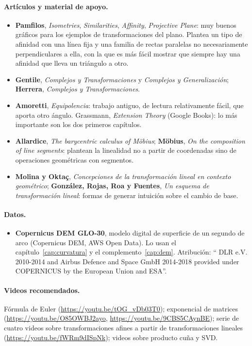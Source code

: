 \paragraph{Artículos y material de apoyo.}
\begin{itemize}
  \item \textbf{Pamfilos}, \emph{Isometries}, \emph{Similarities}, \emph{Affinity},
  \emph{Projective Plane}: muy buenos gráficos para los ejemplos de transformaciones del plano.
  Plantea un tipo de afinidad con una línea fija y una familia de rectas paralelas no
  necesariamente perpendiculares a ella, con la que es más fácil mostrar que siempre hay una
  afinidad que lleva un triángulo a otro.
  \item \textbf{Gentile}, \emph{Complejos y Transformaciones} y \emph{Complejos y
  Generalización}; \textbf{Herrera}, \emph{Complejos y Transformaciones}.
  \item \textbf{Amoretti}, \emph{Equipolencia}: trabajo antiguo, de lectura relativamente
  fácil, que aporta otro ángulo. Grassmann, \emph{Extension Theory} (Google Books): lo más
  importante son los dos primeros capítulos.
  \item \textbf{Allardice}, \emph{The barycentric calculus of Möbius}; \textbf{Möbius},
  \emph{On the composition of line segments}: plantean la linealidad no a partir de
  coordenadas sino de operaciones geométricas con segmentos.
  \item \textbf{Molina y Oktaç}, \emph{Concepciones de la transformación lineal en contexto
  geométrico}; \textbf{González, Rojas, Roa y Fuentes}, \emph{Un esquema de transformación
  lineal}: formas de generar intuición sobre el cambio de base.
\end{itemize}

\paragraph{Datos.}
\begin{itemize}
  \item \textbf{Copernicus DEM GLO-30}, modelo digital de superficie de un segundo de arco
  (Copernicus DEM, AWS Open Data). Lo usan el capítulo~\ref{cap:curvatura} y el
  complemento~\ref{cap:dem}. Atribución: \enquote{\textcopyright{} DLR e.V. 2010-2014 and
  \textcopyright{} Airbus Defence and Space GmbH 2014-2018 provided under COPERNICUS by the
  European Union and ESA}.
\end{itemize}

\paragraph{Videos recomendados.} Fórmula de Euler
(\url{https://youtu.be/tOG_vDb03T0}); exponencial de matrices
(\url{https://youtu.be/O85OWBJ2ayo}, \url{https://youtu.be/9CBS5CAynBE}); serie de cuatro videos sobre
transformaciones afines a partir de transformaciones lineales
(\url{https://youtu.be/fWRm9dISpNk}); videos sobre producto cuña y SVD.
